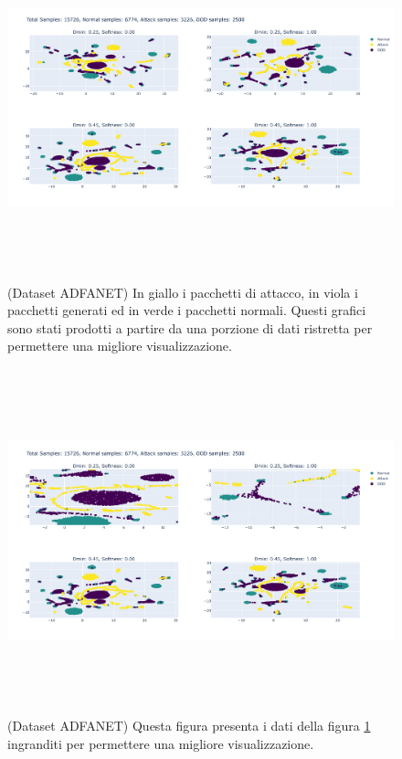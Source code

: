 \begin{figure}[htpb]
    \centering
    \includegraphics[width=\textwidth,height=10cm,keepaspectratio=true]{img/gen_test/adfa/ADFANET_normal_only_reduced_ood.png}
    \caption{
      (Dataset ADFANET) In giallo i pacchetti di attacco, in viola i pacchetti generati ed in verde i pacchetti normali. Questi grafici sono stati prodotti a partire da una porzione di dati ristretta per permettere una migliore visualizzazione.
    }
    \label{fig:gen_ADFA_norm_1}
\end{figure}


\begin{figure}[htpb]
    \centering
    \includegraphics[width=\textwidth,height=10cm,keepaspectratio=true]{img/gen_test/adfa/ADFANET_normal_only_reduced_ood_zoomed.png}
    \caption{
      (Dataset ADFANET) Questa figura presenta i dati della figura \ref{fig:gen_ADFA_norm_1} ingranditi per permettere una migliore visualizzazione.
    }
    \label{fig:gen_ADFA_norm_1_zoomed}
\end{figure}


